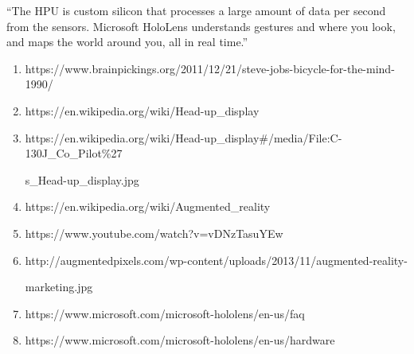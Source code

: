 \documentclass[a4paper,12pt]{article}
\begin{document}
``The HPU is custom silicon that processes a large amount of data per second from the sensors. Microsoft HoloLens understands gestures and where you look, and maps the world around you, all in real time.''
\begin{enumerate}
    \item https://www.brainpickings.org/2011/12/21/steve-jobs-bicycle-for-the-mind-1990/
    \item https://en.wikipedia.org/wiki/Head-up\_display
    \item https://en.wikipedia.org/wiki/Head-up\_display\#/media/File:C-130J\_Co\_Pilot\%27

    s\_Head-up\_display.jpg
    \item https://en.wikipedia.org/wiki/Augmented\_reality
    \item https://www.youtube.com/watch?v=vDNzTasuYEw
    \item http://augmentedpixels.com/wp-content/uploads/2013/11/augmented-reality-

    marketing.jpg
	\item https://www.microsoft.com/microsoft-hololens/en-us/faq
	\item https://www.microsoft.com/microsoft-hololens/en-us/hardware
\end{enumerate}
\end{document}
